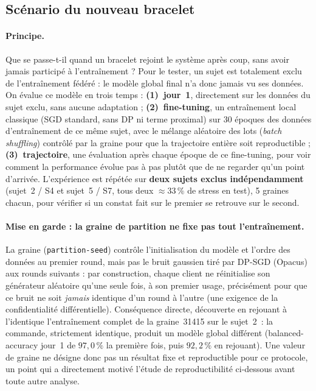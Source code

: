 \documentclass{acmart}
\begin{document}
\subsection{Scénario du nouveau bracelet}
\label{subsec:new_joiner}

\paragraph{Principe.} Que se passe-t-il quand un bracelet rejoint le système
après coup, sans avoir jamais participé à l'entraînement ? Pour le tester,
un sujet est totalement exclu de l'entraînement fédéré : le modèle global
final n'a donc jamais vu ses données. On évalue ce modèle en trois temps :
\textbf{(1)~jour~1}, directement sur les données du sujet exclu, sans aucune
adaptation ; \textbf{(2)~fine-tuning}, un entraînement local classique (SGD
standard, sans DP ni terme proximal) sur 30 époques des données
d'entraînement de ce même sujet, avec le mélange aléatoire des lots
(\textit{batch shuffling}) contrôlé par la graine pour que la trajectoire
entière soit reproductible ; \textbf{(3)~trajectoire}, une évaluation après
chaque époque de ce fine-tuning, pour voir comment la performance évolue
pas à pas plutôt que de ne regarder qu'un point d'arrivée. L'expérience est
répétée sur \textbf{deux sujets exclus indépendamment} (sujet~2 / S4 et
sujet~5 / S7, tous deux $\approx 33\,\%$ de stress en test), 5 graines
chacun, pour vérifier si un constat fait sur le premier se retrouve sur le
second.

\paragraph{Mise en garde : la graine de partition ne fixe pas tout
l'entraînement.} La graine (\texttt{partition-seed}) contrôle
l'initialisation du modèle et l'ordre des données au premier round, mais pas
le bruit gaussien tiré par DP-SGD (Opacus) aux rounds suivants : par
construction, chaque client ne réinitialise son générateur aléatoire qu'une
seule fois, à son premier usage, précisément pour que ce bruit ne soit
\emph{jamais} identique d'un round à l'autre (une exigence de la
confidentialité différentielle). Conséquence directe, découverte en
rejouant à l'identique l'entraînement complet de la graine~31415 sur le
sujet~2~: la commande, strictement identique, produit un modèle global
différent (balanced-accuracy jour~1 de $97{,}0\,\%$ la première fois, puis
$92{,}2\,\%$ en rejouant). Une valeur de graine ne désigne donc pas un
résultat fixe et reproductible pour ce protocole, un point qui a
directement motivé l'étude de reproductibilité ci-dessous avant toute
autre analyse.
\end{document}
